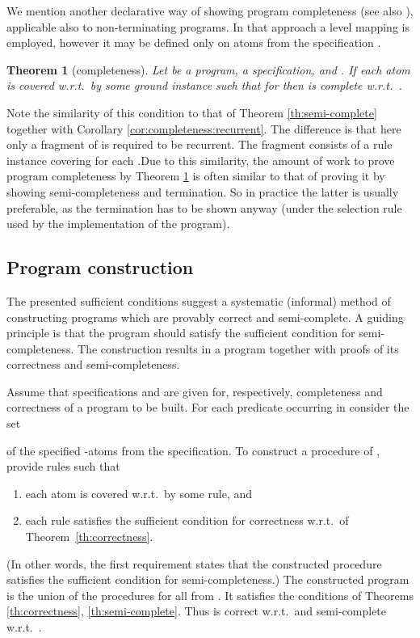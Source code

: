 \documentclass{tlp}
\newtheorem{theorem}{Theorem}
\begin{document}
We mention another declarative way of showing program
completeness \cite{Deransart.Maluszynski93}
(see also \cite{drabent.tocl16}),
applicable also to non-terminating programs.
In that approach a level mapping is employed, however it may be defined only
on atoms 
from the specification .
\begin{theorem}
[completeness]
\label{th:completenessDeransart}
Let  be a program,  a specification, and .
If each atom  is covered w.r.t.\  by some ground
instance  such that 
 for 
then  is complete w.r.t.\ .
  
\end{theorem}



Note the similarity of this condition to that of Theorem \ref{th:semi-complete}
together with  Corollary \ref{cor:completeness:recurrent}.
The difference is that here only a fragment of  is required to be
recurrent.  The fragment consists of a rule instance covering  for each
.\linebreak[3]
Due to this similarity, the amount of work to prove program completeness by 
Theorem \ref{th:completenessDeransart}
is often similar to that of proving it 
by showing semi-completeness and termination.
So in practice the latter is usually preferable, as the termination 
has to be shown anyway
(under the selection rule used by the implementation of the program).









\subsection{Program construction}
\label{sec:construction}
The presented sufficient conditions suggest a systematic (informal) method
of constructing programs which are provably correct and semi-complete.
A guiding principle is that the program should satisfy the sufficient
condition for semi-completeness.
The construction results in a program together with proofs of its
correctness and semi-completeness.

Assume that specifications  and  are given 
for, respectively, completeness and correctness of a program  to be built. 
For each predicate  occurring in  consider the set

of the specified -atoms from the specification.
To construct a procedure  of , provide rules such that
\begin{enumerate}
\item 
\label{requirement1}
  each atom  is covered w.r.t.\  by some rule, and
\item
  each rule satisfies the sufficient condition for correctness
  w.r.t.\  of Theorem~\ref{th:correctness}.
\end{enumerate}
(In other words, the first requirement states that the constructed procedure
{satisfies the sufficient condition for semi-completeness}.)
The constructed program  is the union of the procedures for all  from
.  
It satisfies the conditions of Theorems \ref{th:correctness},
\ref{th:semi-complete}.  Thus  is correct w.r.t.\  and
semi-complete w.r.t.\ .
\end{document}
